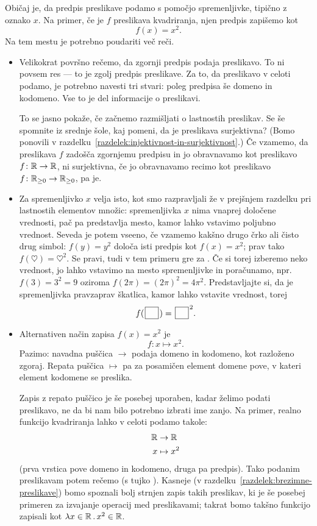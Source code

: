 Običaj je, da predpis preslikave podamo s pomočjo spremenljivke, tipično z oznako $x$. Na primer, če je $f$ preslikava kvadriranja, njen predpis zapišemo kot
\[f(x) = x^2.\]
Na tem mestu je potrebno poudariti več reči.
\begin{itemize}
\item
Velikokrat površno rečemo, da zgornji predpis podaja preslikavo. To ni povsem res --- to je zgolj predpis preslikave. Za to, da preslikavo v celoti podamo, je potrebno navesti tri stvari: poleg predpisa še domeno in kodomeno. Vse to je del informacije o preslikavi.

To se jasno pokaže, če začnemo razmišljati o lastnostih preslikav. Se še spomnite iz srednje šole, kaj pomeni, da je preslikava surjektivna? (Bomo ponovili v razdelku~\ref{razdelek:injektivnost-in-surjektivnost}.) Če vzamemo, da preslikava $f$ zadošča zgornjemu predpisu in jo obravnavamo kot preslikavo $f\colon \mathbb{R} \to \mathbb{R}$, ni surjektivna, če jo obravnavamo recimo kot preslikavo $f\colon \mathbb{R}_{\geq 0} \to \mathbb{R}_{\geq 0}$, pa je.
\item
Za spremenljivko $x$ velja isto, kot smo razpravljali že v prejšnjem razdelku pri lastnostih elementov množic: spremenljivka $x$ nima vnaprej določene vrednosti, pač pa predstavlja mesto, kamor lahko vstavimo poljubno vrednost. Seveda je potem vseeno, če vzamemo kakšno drugo črko ali čisto drug simbol: $f(y) = y^2$ določa isti predpis kot $f(x) = x^2$; prav tako $f(\heartsuit) = \heartsuit^2$. Se pravi, tudi v tem primeru gre za . Če si torej izberemo neko vrednost, jo lahko vstavimo na mesto spremenljivke in poračunamo, npr.~$f(3) = 3^2 = 9$ oziroma $f(2\pi) = (2\pi)^2 = 4\pi^2$. Predstavljajte si, da je spremenljivka pravzaprav škatlica, kamor lahko vstavite vrednost, torej
\[f(\argbox) = \argbox^2.\]
\item
Alternativen način zapisa $f(x) = x^2$ je
\[f\colon x \mapsto x^2.\]
Pazimo: navadna puščica $\to$ podaja domeno in kodomeno, kot razloženo zgoraj. Repata puščica $\mapsto$ pa za posamičen element domene pove, v kateri element kodomene se preslika.

Zapis z repato puščico je še posebej uporaben, kadar želimo podati preslikavo, ne da bi nam bilo potrebno izbrati ime zanjo. Na primer, realno funkcijo kvadriranja lahko v celoti podamo takole:
\begin{align*}
\mathbb{R} &\to \mathbb{R} \\
x &\mapsto x^2
\end{align*}
(prva vrstica pove domeno in kodomeno, druga pa predpis). Tako podanim preslikavam potem rečemo  (s tujko ). Kasneje (v razdelku~\ref{razdelek:brezimne-preslikave}) bomo spoznali bolj strnjen zapis takih preslikav, ki je še posebej primeren za izvajanje operacij med preslikavami; takrat bomo takšno funkcijo zapisali kot $\xlam{x}[\RR]{x^2}[\RR]$.
\end{itemize}

